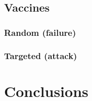\documentclass[DIV=12, BCOR=0pt]{scrartcl}  %
\begin{document}
  \subsection{Vaccines}
  \subsubsection{Random (failure)}
	\subsubsection{Targeted (attack)}

	\section{Conclusions}

		
  \footnotesize
	
\end{document}
